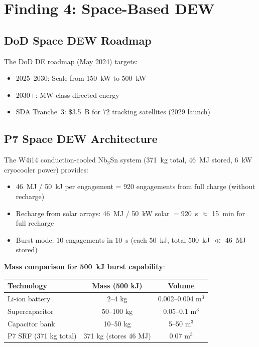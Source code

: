 \documentclass[11pt]{article}
\begin{document}
\section{Finding 4: Space-Based DEW}
\label{sec:space-dew}

\subsection{DoD Space DEW Roadmap}

The DoD DE roadmap (May 2024) targets:
\begin{itemize}[nosep]
  \item 2025--2030: Scale from 150~kW to 500~kW
  \item 2030+: MW-class directed energy
  \item SDA Tranche~3: \$3.5~B for 72 tracking satellites (2029 launch)
\end{itemize}

\subsection{P7 Space DEW Architecture}

The W4i14 conduction-cooled Nb$_3$Sn system (371~kg total,
46~MJ stored, 6~kW cryocooler power) provides:
\begin{itemize}[nosep]
  \item 46~MJ / 50~kJ per engagement = 920 engagements
    from full charge (without recharge)
  \item Recharge from solar arrays: 46~MJ / 50~kW solar
    $= 920$~s $\approx$ 15~min for full recharge
  \item Burst mode: 10 engagements in 10~s (each 50~kJ,
    total 500~kJ $\ll$ 46~MJ stored)
\end{itemize}

\textbf{Mass comparison for 500~kJ burst capability}:
\begin{center}
\begin{tabular}{lcc}
\toprule
Technology & Mass (500 kJ) & Volume \\
\midrule
Li-ion battery & 2--4 kg & 0.002--0.004 m$^3$ \\
Supercapacitor & 50--100 kg & 0.05--0.1 m$^3$ \\
Capacitor bank & 10--50 kg & 5--50 m$^3$ \\
P7 SRF (371 kg total) & 371 kg (stores 46 MJ) & 0.07 m$^3$ \\
\bottomrule
\end{tabular}
\end{center}
\end{document}
